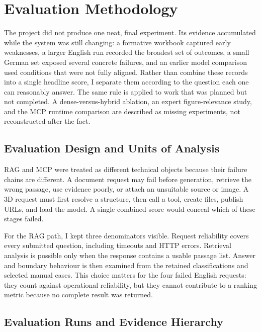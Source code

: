 \chapter{Evaluation Methodology}
\label{chap:evaluation}

The project did not produce one neat, final experiment. Its evidence accumulated while the system was still changing: a formative workbook captured early weaknesses, a larger English run recorded the broadest set of outcomes, a small German set exposed several concrete failures, and an earlier model comparison used conditions that were not fully aligned. Rather than combine these records into a single headline score, I separate them according to the question each one can reasonably answer. The same rule is applied to work that was planned but not completed. A dense-versus-hybrid ablation, an expert figure-relevance study, and the MCP runtime comparison are described as missing experiments, not reconstructed after the fact.

\section{Evaluation Design and Units of Analysis}
\label{sec:evaluation-design}

RAG and MCP were treated as different technical objects because their failure chains are different. A document request may fail before generation, retrieve the wrong passage, use evidence poorly, or attach an unsuitable source or image. A 3D request must first resolve a structure, then call a tool, create files, publish URLs, and load the model. A single combined score would conceal which of these stages failed.

For the RAG path, I kept three denominators visible. Request reliability covers every submitted question, including timeouts and HTTP errors. Retrieval analysis is possible only when the response contains a usable passage list. Answer and boundary behaviour is then examined from the retained classifications and selected manual cases. This choice matters for the four failed English requests: they count against operational reliability, but they cannot contribute to a ranking metric because no complete result was returned.

\section{Evaluation Runs and Evidence Hierarchy}
\label{sec:evaluation-runs}

